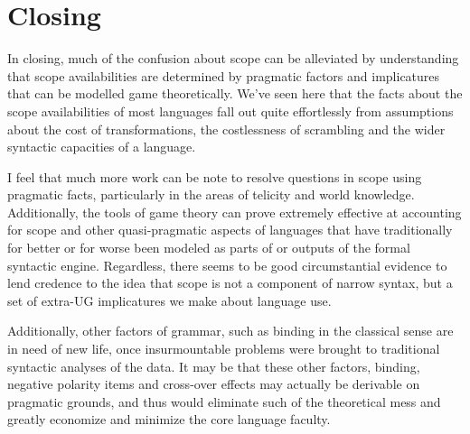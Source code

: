 \documentclass{article}
\begin{document}
\section{Closing}


In closing, much of the confusion about scope can be alleviated by understanding that scope availabilities are determined by pragmatic factors and implicatures that can be modelled game theoretically. We've seen here that the facts about the scope availabilities of most languages fall out quite effortlessly from assumptions about the cost of transformations, the costlessness of scrambling and the wider syntactic capacities of a language.

I feel that much more work can be note to resolve questions in scope using pragmatic facts, particularly in the areas of telicity and world knowledge.
Additionally, the tools of game theory can prove extremely effective at accounting for scope and other quasi-pragmatic aspects of languages that have traditionally for better or for worse been modeled as parts of or outputs of the formal syntactic engine.
Regardless, there seems to be good circumstantial evidence to lend credence to the idea that scope is not a component of narrow syntax, but a set of extra-UG implicatures we make about language use.

Additionally, other factors of grammar, such as binding in the classical sense are in need of new life, once insurmountable problems were brought to traditional syntactic analyses of the data. It may be that these other factors, binding, negative polarity items and cross-over effects may actually be derivable on pragmatic grounds, and thus would eliminate such of the theoretical mess and greatly economize and minimize the core language faculty.

\printbibliography
\end{document}
